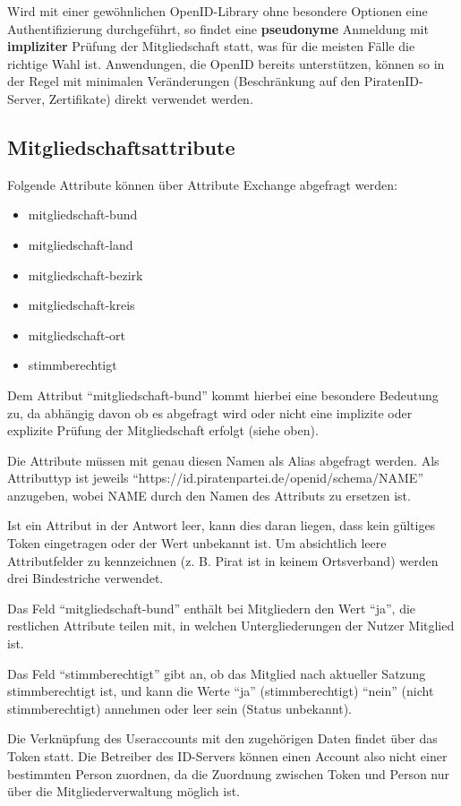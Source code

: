 Wird mit einer gewöhnlichen OpenID-Library ohne besondere Optionen eine Authentifizierung durchgeführt, 
so findet eine \textbf{pseudonyme} Anmeldung mit \textbf{impliziter} Prüfung der Mitgliedschaft statt, was für die meisten Fälle die richtige Wahl ist.
Anwendungen, die OpenID bereits unterstützen, können so in der Regel mit minimalen Veränderungen (Beschränkung auf den PiratenID-Server, Zertifikate) direkt verwendet werden.

\subsection{Mitgliedschaftsattribute}
Folgende Attribute können über Attribute Exchange abgefragt werden:
\label{sec:attribute}
\begin{itemize}
\item mitgliedschaft-bund
\item mitgliedschaft-land
\item mitgliedschaft-bezirk
\item mitgliedschaft-kreis
\item mitgliedschaft-ort
\item stimmberechtigt
\end{itemize}

Dem Attribut "`mitgliedschaft-bund"' kommt hierbei eine besondere Bedeutung zu,
da abhängig davon ob es abgefragt wird oder nicht eine implizite oder explizite Prüfung der Mitgliedschaft erfolgt (siehe oben).

Die Attribute müssen mit genau diesen Namen als Alias abgefragt werden.
Als Attributtyp ist jeweils "`https://id.piratenpartei.de/openid/schema/NAME"' anzugeben, wobei NAME durch den Namen des Attributs zu ersetzen ist.

Ist ein Attribut in der Antwort leer, kann dies daran liegen, dass kein gültiges Token eingetragen oder der Wert unbekannt ist.
Um absichtlich leere Attributfelder zu kennzeichnen (z. B. Pirat ist in keinem Ortsverband) werden drei Bindestriche verwendet.

Das Feld "`mitgliedschaft-bund"' enthält bei Mitgliedern den Wert "`ja"',
die restlichen Attribute teilen mit, in welchen Untergliederungen der Nutzer Mitglied ist.

Das Feld "`stimmberechtigt"' gibt an, ob das Mitglied nach aktueller Satzung stimmberechtigt ist,
und kann die Werte "`ja"' (stimmberechtigt) "`nein"' (nicht stimmberechtigt) annehmen oder leer sein (Status unbekannt).

Die Verknüpfung des Useraccounts mit den zugehörigen Daten findet über das Token statt.
Die Betreiber des ID-Servers können einen Account also nicht einer bestimmten Person zuordnen,
da die Zuordnung zwischen Token und Person nur über die Mitgliederverwaltung möglich ist.


